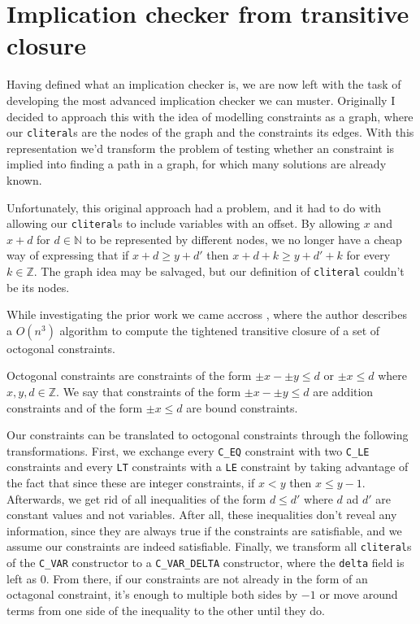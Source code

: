 \chapter{Implication checker from transitive closure}
\label{cap:basic-definitions}

Having defined what an implication checker is, we are now left with the task of
developing the most advanced implication checker we can muster. Originally I
decided to approach this with the idea of modelling constraints as a graph, where
our \texttt{cliteral}s are the nodes of the graph and the constraints its edges. With 
this representation we'd transform the problem of testing whether an constraint is
implied into finding a path in a graph, for which many solutions are already 
known.

Unfortunately, this original approach had a problem, and it had to do with 
allowing our \texttt{cliteral}s to include variables with an offset.
By allowing $x$ and $x + d$ for $d \in \mathbb{N}$ to be represented by 
different nodes, we no longer have a cheap way of expressing that if $x + d \ge y + d'$ then $x + d + k \ge y + d' + k$ for every $k\in \mathbb{Z}$. The graph
idea may be salvaged, but our definition of \texttt{cliteral} couldn't be
its nodes.

While investigating the prior work we came accross \cite{TransitiveClosure}, where
the author describes a $O(n^3)$ algorithm to compute the tightened transitive 
closure of a set of octogonal constraints.

Octogonal constraints are constraints of the form $\pm x - \pm y \le d$ or 
$\pm x \le d$ where $x,y,d \in \mathbb{Z}$. We say that constraints of the form
$\pm x - \pm y \le d$ are addition constraints and of the form $\pm x \le d$ are
bound constraints.

Our constraints can be translated to octogonal constraints through the following 
transformations. First, we exchange every \texttt{C_EQ} constraint with two
\texttt{C_LE} constraints and every \texttt{LT} constraints with a 
\texttt{LE} constraint by taking advantage of the fact that since these are 
integer constraints, if $x < y$ then $x \le y-1$. Afterwards, we get rid of all 
inequalities of the form $d \le d'$ where $d$ ad $d'$ are constant values and not
variables. After all, these inequalities don't reveal any information, since they
are always true if the constraints are satisfiable, and we assume our constraints
are indeed satisfiable. Finally, we transform all \texttt{cliteral}s of the
\texttt{C_VAR} constructor to a \texttt{C_VAR_DELTA} constructor, where
the \texttt{delta} field is left as 0. From there, if our constraints are not
already in the form of an octagonal constraint, it's enough to multiple both sides
by $-1$ or move around terms from one side of the inequality to the other until 
they do.

